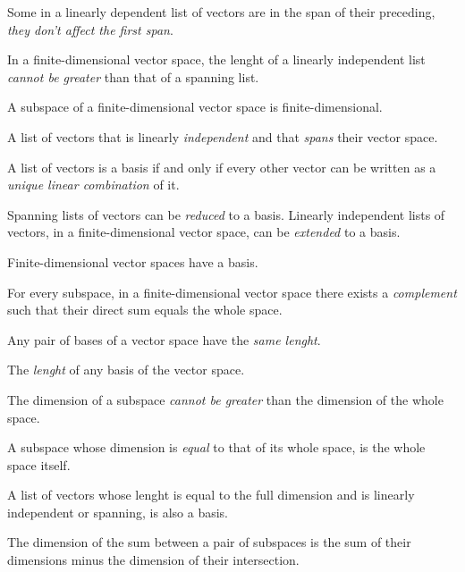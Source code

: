 \begin{multicols}{3}
  Some in a linearly dependent list of vectors are in the span of their preceding, \textit{they don't affect the first span}.
  
  In a finite-dimensional vector space, the lenght of a linearly independent list \textit{cannot be greater} than that of a spanning list.
  
  A subspace of a finite-dimensional vector space is finite-dimensional.
  
  A list of vectors that is linearly \textit{independent} and that \textit{spans} their vector space.
  
  A list of vectors is a basis if and only if every other vector can be written as a \textit{unique linear combination} of it.
  
  Spanning lists of vectors can be \textit{reduced} to a basis. Linearly independent lists of vectors, in a finite-dimensional
  vector space, can be \textit{extended} to a basis.

  Finite-dimensional vector spaces have a basis.
  
  For every subspace, in a finite-dimensional vector space there exists a \textit{complement} such that their direct sum equals the whole space.
  
  Any pair of bases of a vector space have the \textit{same lenght}.
  
  The \textit{lenght} of any basis of the vector space.
  
  The dimension of a subspace \textit{cannot be greater} than the dimension of the whole space.
  
  A subspace whose dimension is \textit{equal} to that of its whole space, is the whole space itself.
  
  A list of vectors whose lenght is equal to the full dimension and is linearly independent or spanning, is also a basis.
  
  The dimension of the sum between a pair of subspaces is the sum of their dimensions minus the dimension of their intersection.


\end{multicols}
